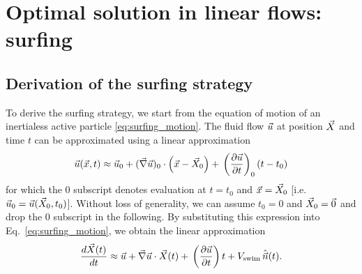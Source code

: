 \section{Optimal solution in linear flows: surfing}\label{sec:the_surfing_strategy_derivation}

\subsection{Derivation of the surfing strategy}\label{sec:the_surfing_strategy_derivation}

To derive the surfing strategy, we start from the equation of motion of an inertialess active particle \eqref{eq:surfing_motion}.
The fluid flow $\vec{u}$ at position $\vec{X}$ and time $t$ can be approximated using a linear approximation
\begin{equation}
	\label{eq:surfing_linear}
	\vec{u} (\vec{x}, t) \approx \vec{u}_0 + (\vec{\nabla} \vec{u})_0 \cdot \left(\vec{x}  - \vec{X}_0\right)+ \, \left(\frac{\partial \vec{u}}{\partial t} \right)_0 \left( t - t_0\right)
\end{equation}
for which the $0$ subscript denotes evaluation at $t = t_0$ and $\vec{x} = \vec{X}_0$ [i.e. $\vec{u}_0 = \vec{u}(\vec{X}_0, t_0)$].
Without loss of generality, we can assume $t_0 = 0$ and $\vec{X}_0 = \vec{0}$ and drop the $0$ subscript in the following. 
By substituting this expression into Eq.~\eqref{eq:surfing_motion}, we obtain the linear approximation
\begin{equation}
	\label{eq:surfing_linear_motion}
	 \frac{d \vec{X}(t)}{d t} \approx \vec{u} + \vec{\nabla} \vec{u} \cdot \vec{X}(t)
	 + \, \left(\frac{\partial \vec{u}}{\partial t} \right) t + V_{\mathrm{swim}} \,\hat{\vec{n}}(t).
\end{equation}


